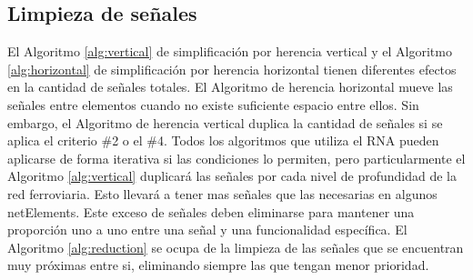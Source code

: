 \subsection{Limpieza de señales}
	\label{sec:limpieza}

	
	El Algoritmo \ref{alg:vertical} de simplificación por herencia vertical y el Algoritmo \ref{alg:horizontal} de simplificación por herencia horizontal tienen diferentes efectos en la cantidad de señales totales. El Algoritmo de herencia horizontal mueve las señales entre elementos cuando no existe suficiente espacio entre ellos. Sin embargo, el Algoritmo de herencia vertical duplica la cantidad de señales si se aplica el criterio \#2 o el \#4. Todos los algoritmos que utiliza el RNA pueden aplicarse de forma iterativa si las condiciones lo permiten, pero particularmente el Algoritmo \ref{alg:vertical} duplicará las señales por cada nivel de profundidad de la red ferroviaria. Esto llevará a tener mas señales que las necesarias en algunos netElements. Este exceso de señales deben eliminarse para mantener una proporción uno a uno entre una señal y una funcionalidad específica. El Algoritmo \ref{alg:reduction} se ocupa de la limpieza de las señales que se encuentran muy próximas entre si, eliminando siempre las que tengan menor prioridad. 

